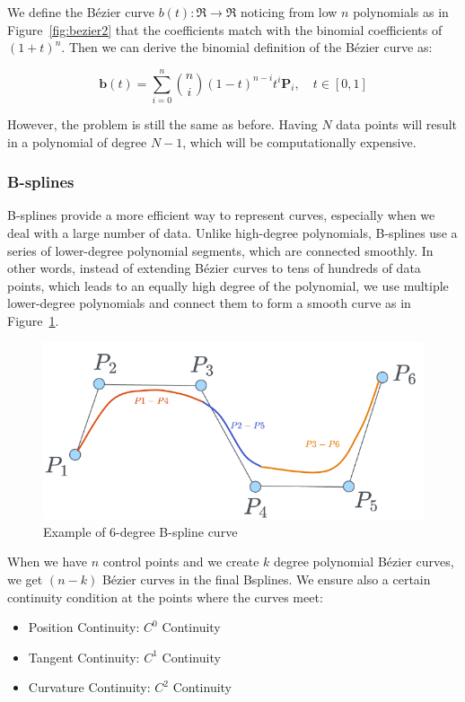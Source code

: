 \documentclass[12pt,a4paper]{article}
\begin{document}
We define the Bézier curve $b(t): \Re \to \Re$ noticing from low $n$ polynomials as in Figure~\ref{fig:bezier2} that the coefficients match with the binomial coefficients of $(1+t)^n$. Then we can derive the binomial definition of the Bézier curve as:

\[
\mathbf{b}(t) = \sum_{i=0}^n \binom{n}{i} (1-t)^{n-i} t^i \mathbf{P}_i, \quad t \in [0, 1]
\]

However, the problem is still the same as before. Having $N$ data points will result in a polynomial of degree $N-1$, which will be computationally expensive.

\subsubsection{B-splines}
B-splines provide a more efficient way to represent curves, especially when we deal with a large number of data. Unlike high-degree polynomials, B-splines use a series of lower-degree polynomial segments, which are connected smoothly.
In other words, instead of extending Bézier curves to tens of hundreds of data points, which leads to an equally high degree of the polynomial, we use multiple lower-degree polynomials and connect them to form a smooth curve as in Figure~\ref{fig:bezier4}.

\begin{figure}[H]
    \centering
    \includegraphics[width=0.5\linewidth]{Images/bezier4.png}
    \caption{Example of 6-degree B-spline curve}
    \label{fig:bezier4}
\end{figure}

When we have $n$ control points and we create $k$ degree polynomial Bézier curves, we get $(n-k)$ Bézier curves in the final Bsplines. We ensure also a certain continuity condition at the points where the curves meet:
\begin{itemize}
    \item Position Continuity: $C^0$ Continuity 
    \item Tangent Continuity: $C^1$ Continuity  
    \item Curvature Continuity: $C^2$ Continuity 
\end{itemize}
\end{document}
